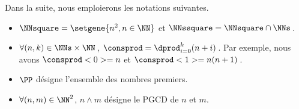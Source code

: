 Dans la suite, nous emploierons les notations suivantes.

\begin{itemize}
	\item $\NNsquare = \setgene{n^2, n \in \NN}$
	      et
	      $\NNssquare = \NNsquare \cap \NNs$\,.

	\item $\forall (n, k) \in \NNs \times \NN$\,, $\consprod = \dprod_{i = 0}^{k} (n + i)$\,. 
	Par exemple, nous avons $\consprod<0> = n$ et $\consprod<1> = n(n+1)$\,.

	\item $\PP$ désigne l'ensemble des nombres premiers.
	

	\item $\forall (n , m) \in \NN^2$, $n \wedge m$ désigne le PGCD de $n$ et $m$.
	
%	
\end{itemize}
